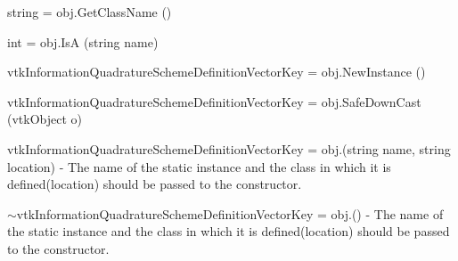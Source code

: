 \begin{DoxyItemize}
\item {\ttfamily string = obj.\-Get\-Class\-Name ()}  
\item {\ttfamily int = obj.\-Is\-A (string name)}  
\item {\ttfamily vtk\-Information\-Quadrature\-Scheme\-Definition\-Vector\-Key = obj.\-New\-Instance ()}  
\item {\ttfamily vtk\-Information\-Quadrature\-Scheme\-Definition\-Vector\-Key = obj.\-Safe\-Down\-Cast (vtk\-Object o)}  
\item {\ttfamily vtk\-Information\-Quadrature\-Scheme\-Definition\-Vector\-Key = obj.(string name, string location)} -\/ The name of the static instance and the class in which it is defined(location) should be passed to the constructor.  
\item {\ttfamily $\sim$vtk\-Information\-Quadrature\-Scheme\-Definition\-Vector\-Key = obj.()} -\/ The name of the static instance and the class in which it is defined(location) should be passed to the constructor.



\end{DoxyItemize}

